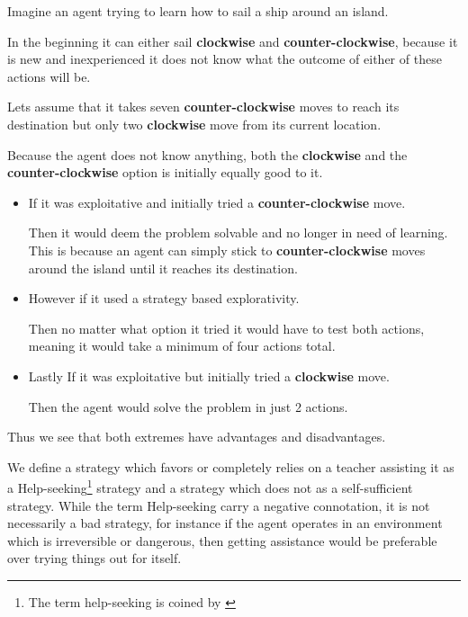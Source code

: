 \documentclass[\master/Master.tex]{subfiles}
\begin{document}
	\begin{example}
		Imagine an agent trying to learn how to sail a ship around an island.
		
		In the beginning it can either sail \textbf{clockwise} and \textbf{counter-clockwise}, because it is new and inexperienced it does not know what the outcome of either of these actions will be. 
		
		Lets assume that it takes seven \textbf{counter-clockwise} moves to reach its destination but only two \textbf{clockwise} move from its current location.
		
		Because the agent does not know anything, both the \textbf{clockwise} and the \textbf{counter-clockwise} option is initially equally good to it.
		
		\begin{itemize}
			\item If it was exploitative and initially tried a \textbf{counter-clockwise} move.
			
			Then it would deem the problem solvable and no longer in need of learning. This is because an agent can simply stick to \textbf{counter-clockwise} moves around the island until it reaches its destination. 
			
			\item However if it used a strategy based explorativity.
			
			Then no matter what option it tried it would have to test both actions, meaning it would take a minimum of four actions total.
			
			\item Lastly If it was exploitative but initially tried a \textbf{clockwise} move.
			
			Then the agent would solve the problem in just 2 actions.
		\end{itemize}
		
		Thus we see that both extremes have advantages and disadvantages.
		
	\end{example}
	
	\begin{definition}
     We define a strategy which favors
    or completely relies on a teacher assisting it as a Help-seeking\footnote{The term help-seeking is coined by \cite{Gall1981224}} strategy
    and a strategy which does not as a self-sufficient strategy. While
    the term Help-seeking carry a negative connotation, it is not necessarily
    a bad strategy, for instance if the agent operates in an environment
    which is irreversible or dangerous, then getting assistance would
    be preferable over trying things out for itself. 

    \end{definition}
    
\end{document}
